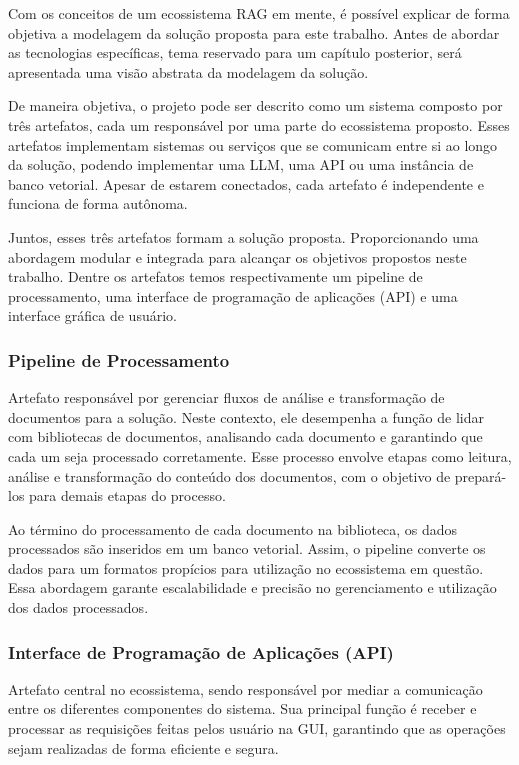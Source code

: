\documentclass[a4paper, 12pt]{article}
\begin{document}
    Com os conceitos de um ecossistema RAG em mente, é possível explicar de forma objetiva a modelagem da solução proposta para este trabalho. Antes de abordar as tecnologias específicas, tema reservado para um capítulo posterior, será apresentada uma visão abstrata da modelagem da solução.

    De maneira objetiva, o projeto pode ser descrito como um sistema composto por três artefatos, cada um responsável por uma parte do ecossistema proposto. Esses artefatos implementam sistemas ou serviços que se comunicam entre si ao longo da solução, podendo implementar uma LLM, uma API ou uma instância de banco vetorial. Apesar de estarem conectados, cada artefato é independente e funciona de forma autônoma.
    
    Juntos, esses três artefatos formam a solução proposta. Proporcionando uma abordagem modular e integrada para alcançar os objetivos propostos neste trabalho. Dentre os artefatos temos respectivamente um pipeline de processamento, uma interface de programação de aplicações (API) e uma interface gráfica de usuário.
    
    \subsubsection{Pipeline de Processamento}

    Artefato responsável por gerenciar fluxos de análise e transformação de documentos para a solução. Neste contexto, ele desempenha a função de lidar com bibliotecas de documentos, analisando cada documento e garantindo que cada um seja processado corretamente. Esse processo envolve etapas como leitura, análise e transformação do conteúdo dos documentos, com o objetivo de prepará-los para demais etapas do processo.  

    Ao término do processamento de cada documento na biblioteca, os dados processados são inseridos em um banco vetorial. Assim, o pipeline converte os dados para um formatos propícios para utilização no ecossistema em questão. Essa abordagem garante escalabilidade e precisão no gerenciamento e utilização dos dados processados.
    
    \subsubsection{Interface de Programação de Aplicações (API)}

    Artefato central no ecossistema, sendo responsável por mediar a comunicação entre os diferentes componentes do sistema. Sua principal função é receber e processar as requisições feitas pelos usuário na GUI, garantindo que as operações sejam realizadas de forma eficiente e segura.
\end{document}
